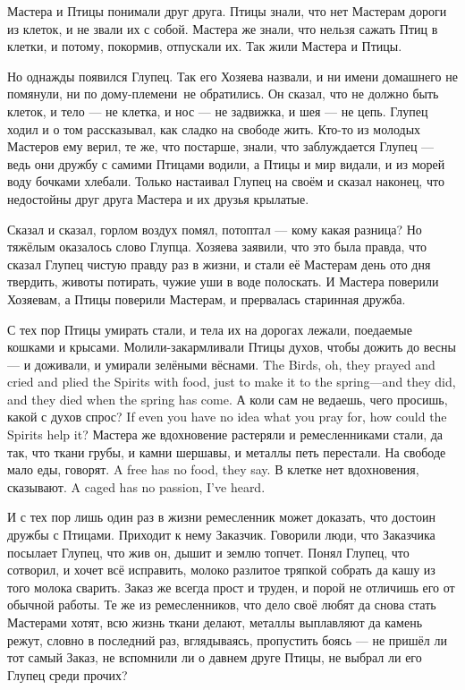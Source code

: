 Мастера и Птицы понимали друг друга.
Птицы знали, что нет Мастерам дороги из клеток, и не звали их с собой.
Мастера же знали, что нельзя сажать Птиц в клетки, и потому, покормив, отпускали их.
Так жили Мастера и Птицы.

Но однажды появился Глупец.
Так его Хозяева назвали, и ни имени домашнего не помянули, ни по дому-племени\FM\ не обратились.
Он сказал, что не должно быть клеток, и тело --- не клетка, и нос --- не задвижка, и шея --- не цепь.
Глупец ходил и о том рассказывал, как сладко на свободе жить.
Кто-то из молодых Мастеров ему верил, те же, что постарше, знали, что заблуждается Глупец --- ведь они дружбу с самими Птицами водили, а Птицы и мир видали, и из морей воду бочками хлебали.
Только настаивал Глупец на своём и сказал наконец, что недостойны друг друга Мастера и их друзья крылатые.

Сказал и сказал, горлом воздух помял, потоптал --- кому какая разница?
Но тяжёлым оказалось слово Глупца.
Хозяева заявили, что это была правда, что сказал Глупец чистую правду раз в жизни, и стали её Мастерам день ото дня твердить, животы потирать, чужие уши в воде полоскать.
И Мастера поверили Хозяевам, а Птицы поверили Мастерам, и прервалась старинная дружба.

С тех пор Птицы умирать стали, и тела их на дорогах лежали, поедаемые кошками и крысами.
{Молили-закармливали Птицы духов, чтобы дожить до весны --- и доживали, и умирали зелёными вёснами.}
{The Birds, oh, they prayed and cried and plied the Spirits with food, just to make it to the spring---and they did, and they died when the spring has come.}
{А коли сам не ведаешь, чего просишь, какой с духов спрос?}
{If even you have no idea what you pray for, how could the Spirits help it?}
Мастера же вдохновение растеряли и ремесленниками стали, да так, что ткани грубы, и камни шершавы, и металлы петь перестали.
{На свободе мало еды, говорят.}
{A free has no food, they say.}
{В клетке нет вдохновения, сказывают.}
{A caged has no passion, I've heard.}

И с тех пор лишь один раз в жизни ремесленник может доказать, что достоин дружбы с Птицами.
Приходит к нему Заказчик.
Говорили люди, что Заказчика посылает Глупец, что жив он, дышит и землю топчет.
Понял Глупец, что сотворил, и хочет всё исправить, молоко разлитое тряпкой собрать да кашу из того молока сварить.
Заказ же всегда прост и труден, и порой не отличишь его от обычной работы.
Те же из ремесленников, что дело своё любят да снова стать Мастерами хотят, всю жизнь ткани делают, металлы выплавляют да камень режут, словно в последний раз, вглядываясь, пропустить боясь --- не пришёл ли тот самый Заказ, не вспомнили ли о давнем друге Птицы, не выбрал ли его Глупец среди прочих?

